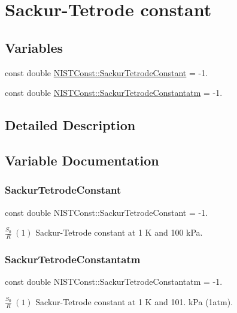 \hypertarget{group___sackur_tetrode_constant}{}\section{Sackur-\/\+Tetrode constant}
\label{group___sackur_tetrode_constant}
\subsection*{Variables}
\begin{DoxyCompactItemize}
\item 
const double \hyperlink{group___sackur_tetrode_constant_gabd9928304da228b5f9c482aa488ea6bd}{N\+I\+S\+T\+Const\+::\+Sackur\+Tetrode\+Constant} = -\/1.
\item 
const double \hyperlink{group___sackur_tetrode_constant_ga476418a3565db707ed30de46c3126220}{N\+I\+S\+T\+Const\+::\+Sackur\+Tetrode\+Constantatm} = -\/1.
\end{DoxyCompactItemize}


\subsection{Detailed Description}


\subsection{Variable Documentation}
\mbox{\label{group___sackur_tetrode_constant_gabd9928304da228b5f9c482aa488ea6bd}} 
\subsubsection{\texorpdfstring{Sackur\+Tetrode\+Constant}{SackurTetrodeConstant}}
{\footnotesize\ttfamily const double N\+I\+S\+T\+Const\+::\+Sackur\+Tetrode\+Constant = -\/1.}

$\frac{S_0}{R} \ (1)$ Sackur-\/\+Tetrode constant at 1 K and 100 k\+Pa. \mbox{\label{group___sackur_tetrode_constant_ga476418a3565db707ed30de46c3126220}} 
\subsubsection{\texorpdfstring{Sackur\+Tetrode\+Constantatm}{SackurTetrodeConstantatm}}
{\footnotesize\ttfamily const double N\+I\+S\+T\+Const\+::\+Sackur\+Tetrode\+Constantatm = -\/1.}

$\frac{S_0}{R} \ (1)$ Sackur-\/\+Tetrode constant at 1 K and 101. k\+Pa (1atm). 